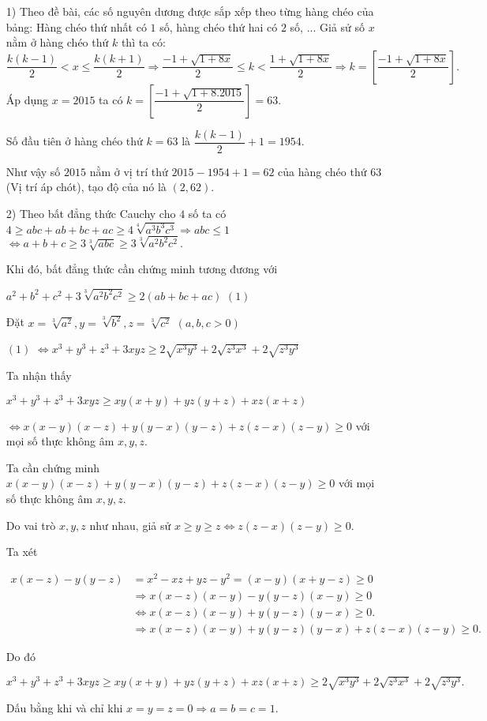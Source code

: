 \begin{ex}
\begin{enumerate}
    \end{enumerate}
\loigiai
    {

    \begin{enumerate}
        \item[1)] Theo đề bài, các số nguyên dương được sắp xếp theo từng hàng chéo của bảng: Hàng chéo thứ 
nhất có $1$ số, hàng chéo thứ hai có $2$ số, ... 
Giả sử số $x$  nằm ở hàng chéo thứ  $k$ thì ta có:  
$\dfrac{k(k-1)}{2} < x \le \dfrac{k(k+1)}{2} \Rightarrow \dfrac{-1+\sqrt{1+8x}}{2} \le k < \dfrac{1+\sqrt{1+8x}}{2} \Rightarrow k = \left[\dfrac{-1+\sqrt{1+8x}}{2} \right].$
Áp dụng $x=2015$ ta có $k = \left[\dfrac{-1+\sqrt{1+8.2015}}{2} \right] = 63.$

Số đầu tiên ở hàng chéo thứ $k=63$ là $\dfrac{k(k-1)}{2}+1=1954.$

Như vậy số $2015$ nằm ở vị trí thứ $2015-1954+1=62$ của hàng chéo thứ $63$ (Vị trí áp chót), tạo độ của nó là $(2,62).$
        \item[2)]  Theo bất đẳng thức Cauchy cho $4$ số ta có
$4 \ge abc+ab+bc+ac \ge 4\sqrt[4]{a^3b^3c^3} \Rightarrow abc \le 1$ $\Leftrightarrow a+b+c \ge 3\sqrt[3]{abc} \ge 3\sqrt[3]{a^2b^2c^2}. $

Khi đó, bất đẳng thức cần chứng minh tương đương với

$a^2+b^2+c^2+3\sqrt[3]{a^2b^2c^2} \ge 2(ab+bc+ac)$ $ (1)$

Đặt $x=\sqrt[3]{a^2},y=\sqrt[3]{b^2},z=\sqrt[3]{c^2}$ $(a,b,c > 0)$

$(1)$ $\Leftrightarrow x^3+y^3+z^3+3xyz \ge 2\sqrt{x^3y^3}+2\sqrt{z^3x^3}+2\sqrt{z^3y^3}$

Ta nhận thấy

$x^3+y^3+z^3 +3xyz \ge xy(x+y)+yz(y+z)+xz(x+z)$

$\Leftrightarrow x(x-y)(x-z)+y(y-x)(y-z)+z(z-x)(z-y) \ge 0$ với mọi số thực không âm $x,y,z.$

Ta cần chứng minh $x(x-y)(x-z)+y(y-x)(y-z)+z(z-x)(z-y) \ge 0$ với mọi số thực không âm $x,y,z.$


Do vai trò $x,y,z$ như nhau, giả sử $x \ge y \ge z \Leftrightarrow z(z-x)(z-y) \ge 0.$

Ta xét 

$\begin{array}{ll}
x(x-z)-y(y-z)&= x^2-xz+yz-y^2 = (x-y)(x+y-z) \ge 0\\ 
&\Rightarrow x(x-z)(x-y)-y(y-z)(x-y) \ge 0 \\
& \Leftrightarrow x(x-z)(x-y)+y(y-z)(y-x) \ge 0.\\
&\Rightarrow x(x-z)(x-y)+y(y-z)(y-x)+ z(z-x)(z-y)\ge 0.
\end{array}$ 

Do đó 

$x^3+y^3+z^3 +3xyz \ge xy(x+y)+yz(y+z)+xz(x+z) \ge 2\sqrt{x^3y^3}+2\sqrt{z^3x^3}+2\sqrt{z^3y^3}.$ 

Dấu bằng khi và chỉ khi $x=y=z=0 \Rightarrow a=b=c=1.$
    \end{enumerate}
   }
\end{ex}


